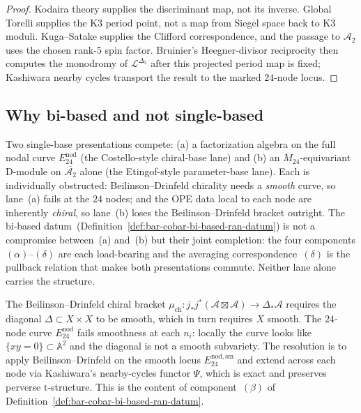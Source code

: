 \begin{proof}
Kodaira theory supplies the discriminant map, not its inverse. Global Torelli supplies the K3 period point, not a map from Siegel space back to K3 moduli. Kuga--Satake supplies the Clifford correspondence, and the passage to \(\mathcal A_2\) uses the chosen rank-\(5\) spin factor. Bruinier's Heegner-divisor reciprocity then computes the monodromy of \(\mathcal L^{\Delta_5}\) after this projected period map is fixed; Kashiwara nearby cycles transport the result to the marked \(24\)-node locus.
\end{proof}

\subsection{Why bi-based and not single-based}

\begin{remark}
\label{rem:bar-cobar-two-base-obstruction}
Two single-base presentations compete: (a) a factorization algebra on the full nodal curve $E^{\mathrm{nod}}_{24}$ (the Costello-style chiral-base lane) and (b) an $M_{24}$-equivariant D-module on $\overline{\mathcal{A}_2}$ alone (the Etingof-style parameter-base lane). Each is individually obstructed: Beilinson--Drinfeld chirality needs a \emph{smooth} curve, so lane~(a) fails at the $24$ nodes; and the OPE data local to each node are inherently \emph{chiral}, so lane~(b) loses the Beilinson--Drinfeld bracket outright. The bi-based datum~(Definition~\ref{def:bar-cobar-bi-based-ran-datum}) is not a compromise between~(a) and~(b) but their joint completion: the four components $(\alpha)$--$(\delta)$ are each load-bearing and the averaging correspondence~$(\delta)$ is the pullback relation that makes both presentations commute. Neither lane alone carries the structure.
\end{remark}

\begin{remark}
\label{rem:bar-cobar-BD-requires-smooth}
The Beilinson--Drinfeld chiral bracket $\mu_{\mathrm{ch}}\colon j_*j^*(\mathcal{A}\boxtimes\mathcal{A})\to \Delta_*\mathcal{A}$ requires the diagonal $\Delta\subset X\times X$ to be smooth, which in turn requires $X$ smooth. The $24$-node curve $E^{\mathrm{nod}}_{24}$ fails smoothness at each $n_i$: locally the curve looks like $\{xy=0\}\subset \mathbb{A}^2$ and the diagonal is not a smooth subvariety. The resolution is to apply Beilinson--Drinfeld on the smooth locus $E^{\mathrm{nod,sm}}_{24}$ and extend across each node via Kashiwara's nearby-cycles functor $\Psi$, which is exact and preserves perverse t-structure. This is the content of component~$(\beta)$ of Definition~\ref{def:bar-cobar-bi-based-ran-datum}.
\end{remark}

